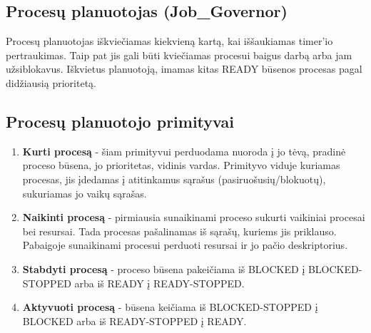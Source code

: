 	\subsection{Procesų planuotojas (Job\_Governor)}
		Procesų planuotojas iškviečiamas kiekvieną kartą, kai iššaukiamas timer'io pertraukimas. Taip pat jis gali būti kviečiamas procesui baigus darbą arba jam užsiblokavus. Iškvietus planuotoją, imamas kitas READY būsenos procesas pagal didžiausią prioritetą.
	\subsection{Procesų planuotojo primityvai}
		\begin{enumerate}
			\item \textbf{Kurti procesą} - šiam primityvui perduodama nuoroda į jo tėvą, pradinė proceso būsena, jo prioritetas, vidinis vardas. Primityvo viduje kuriamas procesas, jis įdedamas į atitinkamus sąrašus (pasiruošusių/blokuotų), sukuriamas jo vaikų sąrašas.
			\item \textbf{Naikinti procesą} - pirmiausia sunaikinami proceso sukurti vaikiniai procesai bei resursai. Tada procesas pašalinamas iš sąrašų, kuriems jis priklauso. Pabaigoje sunaikinami procesui perduoti resursai ir jo pačio deskriptorius.
			\item \textbf{Stabdyti procesą} - proceso būsena pakeičiama iš BLOCKED į BLOCKED-STOPPED arba iš READY į READY-STOPPED.
			\item  \textbf{Aktyvuoti procesą} - būsena keičiama iš BLOCKED-STOPPED į BLOCKED arba iš READY-STOPPED į READY.
		\end{enumerate}
	\clearpage